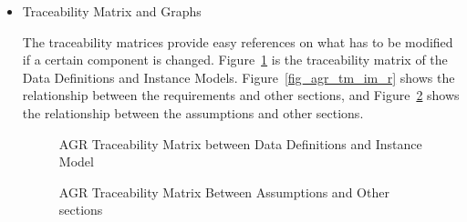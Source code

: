 \begin{itemize}
\item Traceability Matrix and Graphs

The traceability matrices provide easy references on what has to be modified if a certain component is changed. Figure~\ref{fig_agr_tm_dd_im} is the traceability matrix of the Data Definitions and Instance Models. Figure~\ref{fig_agr_tm_im_r} shows the relationship between the requirements and other sections, and Figure~\ref{fig_agr_tm_a} shows the relationship between the assumptions and other sections.
\begin{figure}[H]
    \centering
    \caption[AGR Traceability Matrix between Data Definitions and Instance Model]{AGR Traceability Matrix between Data Definitions and Instance Model}
    \label{fig_agr_tm_dd_im}
\end{figure}

\begin{figure}[H]
    \centering
    \caption[AGR Traceability Matrix Between Assumptions and Other sections]{AGR Traceability Matrix Between Assumptions and Other sections}
    \label{fig_agr_tm_a}
\end{figure}


\end{itemize}
